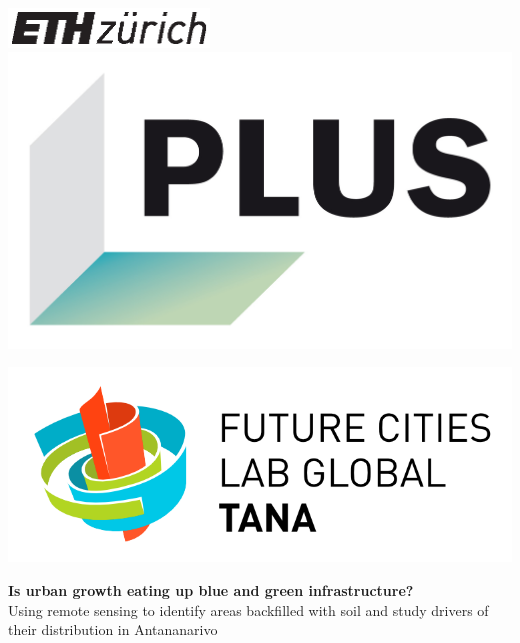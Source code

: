 \begin{titlepage}

\includegraphics[width = 0.4\textwidth]{A_Pre/A_img/eth_logo_kurz_pos.eps}
\hspace{2cm}
\includegraphics[width = .2\textwidth]{A_Pre/A_img/PLUS_logo.jpg}

\hspace{8cm}\includegraphics[width = .3\textwidth]{A_Pre/A_img/fcl_tana_logo_2.png}

\begin{center} 
\vspace{1cm}    
\vspace{.5cm} 

\Huge
    \textbf{Is urban growth eating up blue and green infrastructure?}\\ %
\vspace{1cm}
\Large 
    Using remote sensing to identify areas backfilled with soil and study drivers of their distribution in Antananarivo\\
    
\vspace{.5cm}
 

\end{center}
\end{titlepage}
